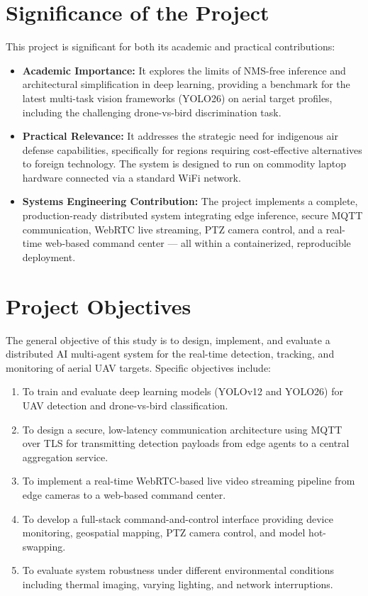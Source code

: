 \documentclass[12pt,a4paper]{report}
\begin{document}
\section{Significance of the Project}

This project is significant for both its academic and practical contributions:

\begin{itemize}
  \item \textbf{Academic Importance:} It explores the limits of NMS-free inference
  and architectural simplification in deep learning, providing a benchmark for the
  latest multi-task vision frameworks (YOLO26) on aerial target profiles, including
  the challenging drone-vs-bird discrimination task.

  \item \textbf{Practical Relevance:} It addresses the strategic need for indigenous
  air defense capabilities, specifically for regions requiring cost-effective
  alternatives to foreign technology. The system is designed to run on commodity
  laptop hardware connected via a standard WiFi network.

  \item \textbf{Systems Engineering Contribution:} The project implements a complete,
  production-ready distributed system integrating edge inference, secure MQTT
  communication, WebRTC live streaming, PTZ camera control, and a real-time
  web-based command center — all within a containerized, reproducible deployment.
\end{itemize}

\section{Project Objectives}

The general objective of this study is to design, implement, and evaluate a
distributed AI multi-agent system for the real-time detection, tracking, and
monitoring of aerial UAV targets. Specific objectives include:

\begin{enumerate}
  \item To train and evaluate deep learning models (YOLOv12 and YOLO26) for
  UAV detection and drone-vs-bird classification.

  \item To design a secure, low-latency communication architecture using MQTT over
  TLS for transmitting detection payloads from edge agents to a central aggregation
  service.

  \item To implement a real-time WebRTC-based live video streaming pipeline from
  edge cameras to a web-based command center.

  \item To develop a full-stack command-and-control interface providing device
  monitoring, geospatial mapping, PTZ camera control, and model hot-swapping.

  \item To evaluate system robustness under different environmental conditions
  including thermal imaging, varying lighting, and network interruptions.
\end{enumerate}
\end{document}
